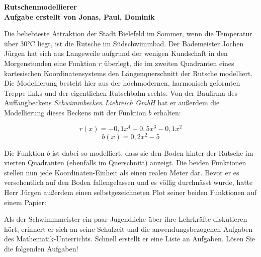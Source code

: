 \documentclass[ngerman, a4paper, 11pt]{article}
\begin{document}
\begin{center}
    \huge \bf{Rutschenmodellierer}\\
    \footnotesize{Aufgabe erstellt von Jonas, Paul, Dominik}
\end{center}

\vspace{1.5cm}

Die beliebteste Attraktion der Stadt Bielefeld im Sommer,
wenn die Temperatur über 30°C liegt,
ist die Rutsche im Südschwimmbad.
Der Bademeister Jochen Jürgen hat sich aus Langeweile
aufgrund der wenigen Kundschaft in den Morgenstunden eine Funktion $r$ überlegt,
die im zweiten Quadranten eines kartesischen Koordinatensystems den Längenquerschnitt der Rutsche modelliert.
Die Modellierung besteht hier aus der hochmodernen, harmonisch geformten Treppe links
und der eigentlichen Rutschbahn rechts.
Von der Baufirma des Auffangbeckens \textit{Schwimmbecken Liebreich GmbH}
hat er außerdem die Modellierung dieses Beckens mit der Funktion $b$ erhalten:

$$r(x) = -0,1x^4 - 0,5x^3 - 0,1x^2$$
$$b(x) = 0,2x^2 - 5$$

Die Funktion $b$ ist dabei so modelliert, dass sie den Boden hinter der Rutsche im vierten Quadranten (ebenfalls im Querschnitt) anzeigt.
Die beiden Funktionen stellen nun jede Koordinaten-Einheit als einen realen Meter dar.
Bevor er es versehentlich auf den Boden fallengelassen und es völlig durchnässt wurde,
hatte Herr Jürgen außerdem einen selbstgezeichneten Plot seiner beiden Funktionen auf einem Papier:

\begin{figure}[h]
    \centering
\end{figure}

Als der Schwimmmeister ein paar Jugendliche über ihre Lehrkräfte diskutieren hört,
erinnert er sich an seine Schulzeit und die anwendungsbezogenen Aufgaben des Mathematik-Unterrichts.
Schnell erstellt er eine Liste an Aufgaben. Lösen Sie die folgenden Aufgaben!
\end{document}
